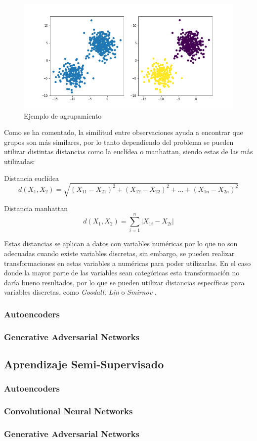 \begin{figure}[H]
    \centering
    \includegraphics[width=12cm]{figs/clustering_example.png}
    \caption{Ejemplo de agrupamiento}
    \label{fig:agrupEj}
\end{figure}

Como se ha comentado, la similitud entre observaciones ayuda a encontrar que grupos son más similares, por lo tanto dependiendo del problema se pueden utilizar distintas distancias como la euclídea o manhattan, siendo estas de las más utilizadas: 

Distancia euclídea
\begin{equation}
    d(X_1, X_2) = \sqrt{(X_{11} - X_{21})^2 + (X_{12} - X_{22})^2 + ... +  (X_{1n} - X_{2n})^2}
\end{equation}

Distancia manhattan
\begin{equation}
    d(X_1, X_2) = \sum_{i=1}^{n}|X_{1i} - X_{2i}|
\end{equation}

Estas distancias se aplican a datos con variables numéricas por lo que no son adecuadas cuando existe variables discretas, sin embargo, se pueden realizar transformaciones en estas variables a numéricas para poder utilizarlas. En el caso donde la mayor parte de las variables sean categóricas esta transformación no daría bueno resultados, por lo que se pueden utilizar distancias específicas para variables discretas, como \textit{Goodall, Lin} o \textit{Smirnov} \cite{boriah2008similarity}.

\subsubsection{Autoencoders}
\subsubsection{Generative Adversarial Networks}

\subsection{Aprendizaje Semi-Supervisado}
\subsubsection{Autoencoders}
\subsubsection{Convolutional Neural Networks}
\subsubsection{Generative Adversarial Networks}